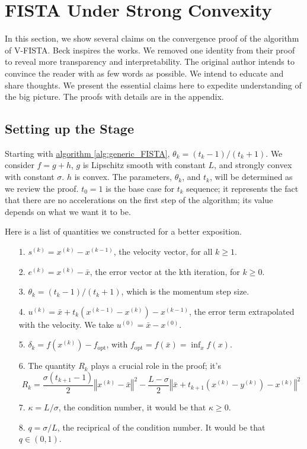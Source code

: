 \documentclass[]{article}
\theoremstyle{definition}
\numberwithin{equation}{subsection}
\begin{document}
\section{FISTA Under Strong Convexity}\label{sec:fista_strong_convexity}
    In this section, we show several claims on the convergence proof of the algorithm of V-FISTA. 
    Beck \cite[10.7.7]{beck_first-order_nodate} inspires the works. 
    We removed one identity from their proof to reveal more transparency and interpretability. 
    The original author intends to convince the reader with as few words as possible. 
    We intend to educate and share thoughts. 
    We present the essential claims here to expedite understanding of the big picture. 
    The proofs with details are in the appendix. 
    \subsection{Setting up the Stage}
        Starting with \hyperref[alg:generic_FISTA]{algorithm \ref*{alg:generic_FISTA}}, $\theta_k = (t_k - 1)/(t_k + 1)$. 
        We consider $f = g + h$, $g$ is Lipschitz smooth with constant $L$, and strongly convex with constant $\sigma$. 
        $h$ is convex. 
        The parameters, $\theta_k$, and $t_k$, will be determined as we review the proof. 
        $t_{0} = 1$ is the base case for $t_k$ sequence; it represents the fact that there are no accelerations on the first step of the algorithm; its value depends on what we want it to be. 
        \par
        Here is a list of quantities we constructed for a better exposition. 
        \begin{itemize}
            \item [1.] $s^{(k)} = x^{(k)} - x^{(k - 1)}$, the velocity vector,
            for all $k\ge 1$. 
            \item [2.] $e^{(k)} = x^{(k)} - \bar x$, the error vector at the kth iteration, for $k \ge 0$. 
            \item [3.] $\theta_k = (t_k -1)/(t_k + 1)$, which is the momentum step size. 
            \item [4.] $u^{(k)} = \bar x + t_{k}(x^{(k - 1)} - x^{(k)}) - x^{(k - 1)}$, the error term extrapolated with the velocity. We take $u^{(0)} = \bar x - x^{(0)}$. 
            \item [5.] $\delta_k = f(x^{(k)}) - f_{\text{opt}}$, with $f_{\text{opt}} = f(\bar x) = \inf_x f(x)$. 
            \item [6.] The quantity $R_k$ plays a crucial role in the proof; it's
            $$
                R_k = 
                \frac{\sigma(t_{k + 1} - 1)}{2}
                \left\Vert
                    x^{(k)} - \bar x
                \right\Vert^2 
                - 
                \frac{L - \sigma}{2}
                \left\Vert
                    \bar x + t_{k + 1}\left( x^{(k)} - y^{(k)}\right) - x^{(k)}
                \right\Vert^2
            $$
            \item [7.] $\kappa = L/\sigma$, the condition number, it would be that $\kappa \ge 0$. 
            \item [8.] $q = \sigma/L$, the reciprical of the condition number. It would be that $q \in (0, 1)$. 
        \end{itemize}
\end{document}
